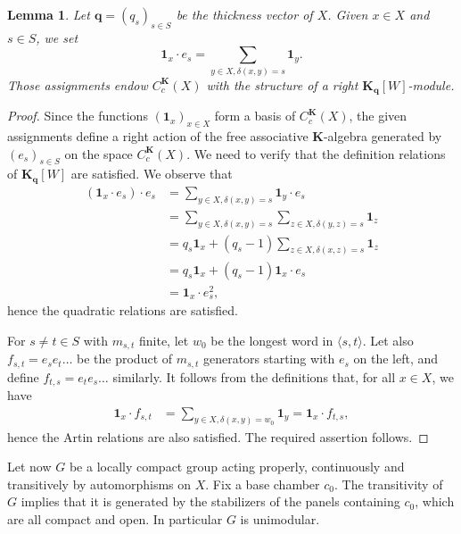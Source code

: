 \documentclass[12pt,a4paper]{amsproc}
\newtheorem{lemma}[theorem]{Lemma}
\theoremstyle{definition}
\newcommand{\KK}{\mathbf K}
\newcommand{\one}{\mathbf 1}
\newcommand{\qq}{\mathbf q}
\begin{document}
\begin{lemma}\label{lem:right-H-mod}
Let $\qq = (q_s)_{s \in S}$ be the thickness vector of $X$. 
  Given $x \in X$ and $s \in S$, we set  
$$\one_x \cdot e_s =   \sum_{y \in X, \delta(x, y)=s} \one_y. $$
Those assignments endow $C^\KK_c(X)$ with the structure of a right $\KK_{\mathbf q}[W]$-module. 
\end{lemma}
\begin{proof}
Since the functions $(\one_x)_{x \in X}$ form a basis of  $C_c^\KK(X)$, the given assignments define a right action of the free associative $\KK$-algebra generated by $(e_s)_{s \in S}$ on the space $C_c^\KK(X)$. We need to verify that the definition relations of $\KK_\qq[W]$ are satisfied.
We observe that 
\begin{align*}
(\one_x \cdot e_s)\cdot e_s & = \sum_{y \in X, \delta(x, y)=s} \one_y \cdot e_s\\
& =  \sum_{y \in X, \delta(x, y)=s} \sum_{z \in X, \delta(y, z) = s} \one_z \\
&= q_s \one_x + (q_s-1) \sum_{z \in X, \delta(x, z)=s} \one_z\\
&=q_s \one_x + (q_s-1) \one_x \cdot e_s\\
&= \one_x \cdot e_s^2,
\end{align*}
hence the quadratic relations are satisfied. 

For $s \neq t \in S$ with $m_{s, t}$ finite, let $w_0 $ be the longest word in $\langle s, t \rangle$. Let also $f_{s, t} = e_s e_t \dots$ be the product of $m_{s, t}$ generators starting with $e_s$ on the left, and define $f_{t, s}= e_t e_s \dots$ similarly. It follows from the definitions that, for all $x \in X$, we have
 \begin{align*}
\one_x \cdot  f_{s, t} &=  \sum_{y \in X, \delta(x, y)=w_0} \one_y 
= \one_x \cdot f_{t, s},
\end{align*}
hence the Artin relations are also satisfied. The required assertion follows. 
\end{proof}
	

\medskip
Let now $G$ be a locally compact group acting properly, continuously and transitively by automorphisms on $X$.
Fix a base chamber $c_0$. The transitivity of $G$ implies that  it is generated by the stabilizers of the panels containing $c_0$, which are all compact and open. In particular $G$ is unimodular. 
\end{document}
